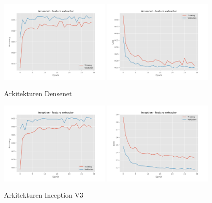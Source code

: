 \documentclass{kththesis}
\begin{document}
    \begin{figure}
      \centering
      \includegraphics[width=0.49\textwidth]{"./balcony/balcony-20split - acc - densenet - feature extractor"}
      \includegraphics[width=0.49\textwidth]{"./balcony/balcony-20split - loss - densenet - feature extractor"}
      \caption{Arkitekturen Densenet}
    \end{figure}

    \begin{figure}
      \centering
      \includegraphics[width=0.49\textwidth]{"./balcony/balcony-20split - acc - inception - feature extractor"}
      \includegraphics[width=0.49\textwidth]{"./balcony/balcony-20split - loss - inception - feature extractor"}
      \caption{Arkitekturen Inception V3}
    \end{figure}
\end{document}
